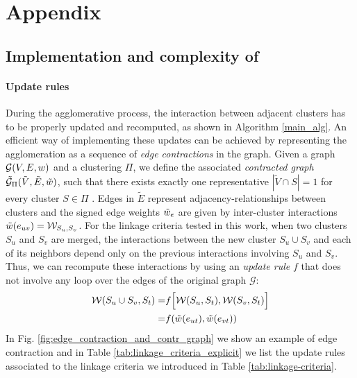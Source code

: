 
\renewcommand{\thesection}{A\arabic{section}}
\renewcommand{\thetable}{A\arabic{table}}
\renewcommand{\thefigure}{A\arabic{figure}}



\section{Appendix}

\subsection{Implementation and complexity of \algname{}} \label{sec:detailed_impl}

\paragraph*{Update rules} During the agglomerative process, the interaction between adjacent clusters has to be properly updated and recomputed, as shown in Algorithm \ref{main_alg}.  
An efficient way of implementing these updates can be achieved by representing the agglomeration as a sequence of \emph{edge contractions} in the graph. Given a graph $\mathcal{G}(V,E,w)$ and a clustering $\Pi$, we define the associated \emph{contracted graph} $\tilde{\mathcal{G}}_\Pi(\tilde{V}, \tilde{E}, \tilde{w})$, such that there exists exactly one representative $|\tilde{V} \cap S| = 1$ for every cluster $S \in \Pi$ . Edges in $\tilde{E}$ represent adjacency-relationships between clusters 
and the signed edge weights $\tilde{w}_e$ are given by inter-cluster interactions $\tilde{w}(e_{uv})=\mathcal{W}_{S_u,S_v}$. 
For the linkage criteria tested in this work, when two clusters $S_u$ and $S_v$ are merged, the interactions between the new cluster $S_u \cup S_v$ and each of its neighbors depend only on the previous interactions involving $S_u$ and $S_v$. Thus, we can recompute these interactions by using an \emph{update rule} $f$ that does not involve any loop over the edges of the original graph $\mathcal{G}$:
\begin{align}
  \mathcal{W}(S_u \cup S_v,S_t) =& f\Big[ \mathcal{W}(S_u,S_t), \mathcal{W}(S_v,S_t) \Big] \\
  =& f(\tilde{w}(e_{ut}), \tilde{w}(e_{vt})) 
\end{align}
In Fig. \ref{fig:edge_contraction_and_contr_graph} we show an example of edge contraction and in Table \ref{tab:linkage_criteria_explicit} we list the update rules associated to the linkage criteria we introduced in Table \ref{tab:linkage-criteria}.

